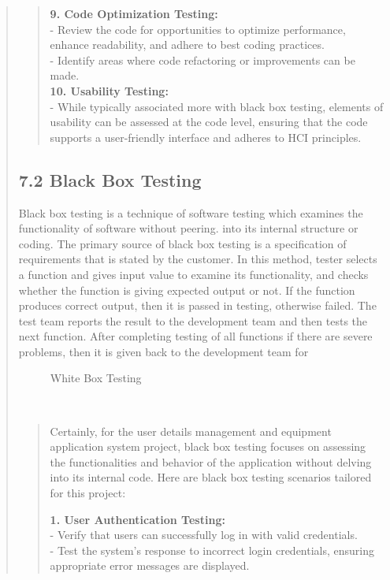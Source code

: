 \documentclass[12pt]{report}
\begin{document}
\begin{quote}
\begin{quote}
			\textbf{9. Code Optimization Testing:}\\
			- Review the code for opportunities to optimize performance, enhance readability, and adhere to best coding practices.\\
			- Identify areas where code refactoring or improvements can be made.\\
			
			\textbf{10. Usability Testing:}\\
			- While typically associated more with black box testing, elements of usability can be assessed at the code level, ensuring that the code supports a user-friendly interface and adheres to HCI principles.\\
		\end{quote}
		
		
		\subsection{7.2 Black Box Testing}
		Black box testing is a technique of software testing which examines the functionality of software without peering. into its internal structure or coding. The primary source of black box testing is a specification of requirements that is stated by the customer.
		In this method, tester selects a function and gives input value to examine its functionality, and checks whether the function is giving expected output or not. If the function produces correct output, then it is passed in testing, otherwise failed. The test team reports the result to the development team and then tests the next function. After completing testing of all functions if there are severe problems, then it is given back to the development team for
		\begin{figure}
			\centering
			\caption{White Box Testing}
		\end{figure}\\
		\begin{quote}
			Certainly, for the user details management and equipment application system project, black box testing focuses on assessing the functionalities and behavior of the application without delving into its internal code. Here are black box testing scenarios tailored for this project:
			
			\textbf{1. User Authentication Testing:}\\
			- Verify that users can successfully log in with valid credentials.\\
			- Test the system's response to incorrect login credentials, ensuring appropriate error messages are displayed.
			

\end{quote}
\end{quote}
\end{document}
